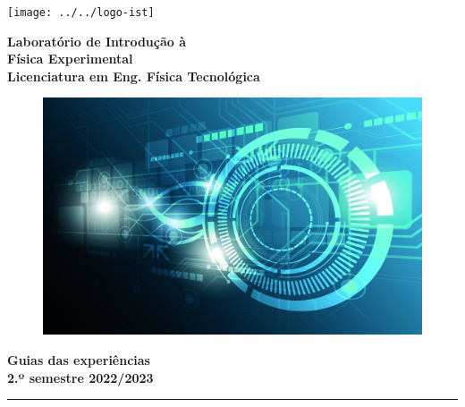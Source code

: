 \documentclass[a4paper,twoside,11pt]{report}      %
\author{Prof. Bernardo B. Carvalho}
\newcommand{\HRule}{\rule{\linewidth}{0.5mm}}
\begin{document}
 
\thispagestyle{empty} 
	\texttt{[image: ../../logo-ist]}%

\begin{center}
\vspace{2cm}
 {\Huge \bf{Laboratório de Introdução à}}\\
  {\Huge \bf{Física Experimental}}\\
\vspace{1cm}
 {\large \bf{Licenciatura em Eng. Física Tecnológica}}\\
\vspace{2cm}
 \begin{figure}[htb] 
	\centering 
	\includegraphics[width=1.0\textwidth]{cover} 
\end{figure}


 {\huge \bf{Guias das experiências}}\\
 \vspace{2cm}
 {\large \bf{2.º semestre 2022/2023}}\\
\end{center}

\newpage
 \vspace{4cm}
\tableofcontents

\HRule \\[0.5cm]
\end{document}
